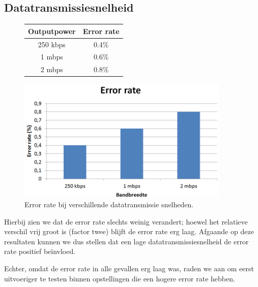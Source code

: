 \documentclass[a4paper,10pt]{article}
\begin{document}
\subsection{Datatransmissiesnelheid}
\begin{figure}[h!]
    \begin{minipage}{\textwidth}
        \begin{minipage}{0.49\textwidth}
            \centering
            \begin{tabular}{cc} \hline
                Outputpower &  Error rate   \\ \hline
                250 kbps    &  0.4\%        \\
                1 mbps      &  0.6\%        \\
                2 mbps      &  0.8\%        \\ \hline
            \end{tabular}
        \end{minipage}
        \hfill
        \begin{minipage}{0.49\textwidth}
            \centering
            \includegraphics[width=0.9\textwidth]{bandbreedte.png}
        \end{minipage}
        \caption{Error rate bij verschillende datatransmissie snelheden.}
    \end{minipage}
\end{figure}
Hierbij zien we dat de error rate slechts weinig verandert; hoewel het relatieve verschil vrij groot is (factor twee) blijft de error rate erg laag. Afgaande op deze resultaten kunnen we dus stellen dat een lage datatransmissiesnelheid de error rate positief be\"invloed.

Echter, omdat de error rate in alle gevallen erg laag was, raden we aan om eerst uitvoeriger te testen binnen opstellingen die een hogere error rate hebben.
\end{document}
